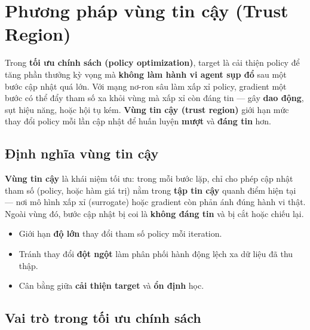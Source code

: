 \section{Phương pháp vùng tin cậy (Trust Region)}
\label{sec:trust-region}

\begin{ynghia}[title={Vai trò trong học tăng cường sâu}]
Trong \textbf{tối ưu chính sách (policy optimization)}, target là cải thiện policy để tăng phần thưởng kỳ vọng mà \textbf{không làm hành vi agent sụp đổ} sau một bước cập nhật quá lớn. Với mạng nơ-ron sâu làm xấp xỉ policy, gradient một bước có thể đẩy tham số xa khỏi vùng mà xấp xỉ còn đáng tin --- gây \textbf{dao động}, sụt hiệu năng, hoặc hội tụ kém. \textbf{Vùng tin cậy (trust region)} giới hạn mức thay đổi policy mỗi lần cập nhật để huấn luyện \textbf{mượt} và \textbf{đáng tin} hơn.
\end{ynghia}

\subsection{Định nghĩa vùng tin cậy}

\begin{dinhnghia}[title={Trust region}]
\textbf{Vùng tin cậy} là khái niệm tối ưu: trong mỗi bước lặp, chỉ cho phép cập nhật tham số (policy, hoặc hàm giá trị) nằm trong \textbf{tập tin cậy} quanh điểm hiện tại --- nơi mô hình xấp xỉ (surrogate) hoặc gradient còn phản ánh đúng hành vi thật. Ngoài vùng đó, bước cập nhật bị coi là \textbf{không đáng tin} và bị cắt hoặc chiếu lại.
\end{dinhnghia}

\begin{tinhchat}[title={Hệ quả khi huấn luyện policy}]
\begin{itemize}
  \item Giới hạn \textbf{độ lớn} thay đổi tham số policy mỗi iteration.
  \item Tránh thay đổi \textbf{đột ngột} làm phân phối hành động lệch xa dữ liệu đã thu thập.
  \item Cân bằng giữa \textbf{cải thiện target} và \textbf{ổn định} học.
\end{itemize}
\end{tinhchat}

\subsection{Vai trò trong tối ưu chính sách}

